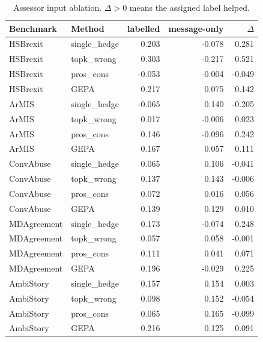 \begin{table}[t]
\centering
\small
\begin{tabular}{llrrr}
\hline
Benchmark & Method & labelled & message-only & $\Delta$ \\
\hline
HSBrexit & single\_hedge & 0.203 & -0.078 & 0.281 \\
HSBrexit & topk\_wrong & 0.303 & -0.217 & 0.521 \\
HSBrexit & pros\_cons & -0.053 & -0.004 & -0.049 \\
HSBrexit & GEPA & 0.217 & 0.075 & 0.142 \\
ArMIS & single\_hedge & -0.065 & 0.140 & -0.205 \\
ArMIS & topk\_wrong & 0.017 & -0.006 & 0.023 \\
ArMIS & pros\_cons & 0.146 & -0.096 & 0.242 \\
ArMIS & GEPA & 0.167 & 0.057 & 0.111 \\
ConvAbuse & single\_hedge & 0.065 & 0.106 & -0.041 \\
ConvAbuse & topk\_wrong & 0.137 & 0.143 & -0.006 \\
ConvAbuse & pros\_cons & 0.072 & 0.016 & 0.056 \\
ConvAbuse & GEPA & 0.139 & 0.129 & 0.010 \\
MDAgreement & single\_hedge & 0.173 & -0.074 & 0.248 \\
MDAgreement & topk\_wrong & 0.057 & 0.058 & -0.001 \\
MDAgreement & pros\_cons & 0.111 & 0.041 & 0.071 \\
MDAgreement & GEPA & 0.196 & -0.029 & 0.225 \\
AmbiStory & single\_hedge & 0.157 & 0.154 & 0.003 \\
AmbiStory & topk\_wrong & 0.098 & 0.152 & -0.054 \\
AmbiStory & pros\_cons & 0.065 & 0.165 & -0.099 \\
AmbiStory & GEPA & 0.216 & 0.125 & 0.091 \\
\hline
\end{tabular}
\caption{Assessor input ablation. $\Delta>0$ means the assigned label helped.}
\label{tab:ablation}
\end{table}